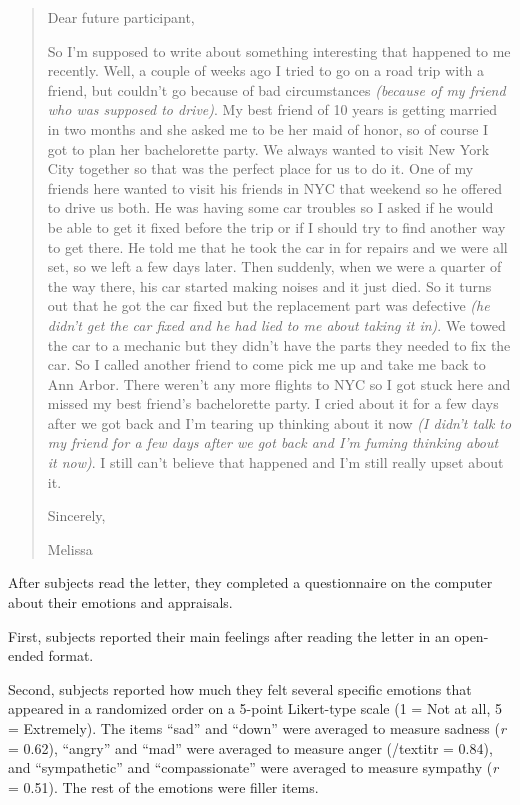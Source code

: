 \documentclass[man,a4paper,noextraspace,apacite]{apa6}\usepackage[]{graphicx}\usepackage[]{color}
\begin{document}
\begin{quote}
Dear future participant,

    So I'm supposed to write about something interesting that happened to me recently. Well, a couple of weeks ago I tried to go on a road trip with a friend, but couldn't go because of bad circumstances \textit{(because of my friend who was supposed to drive)}. My best friend of 10 years is getting married in two months and she asked me to be her maid of honor, so of course I got to plan her bachelorette party. We always wanted to visit New York City together so that was the perfect place for us to do it. One of my friends here wanted to visit his friends in NYC that weekend so he offered to drive us both. He was having some car troubles so I asked if he would be able to get it fixed before the trip or if I should try to find another way to get there. He told me that he took the car in for repairs and we were all set, so we left a few days later. Then suddenly, when we were a quarter of the way there, his car started making noises and it just died. So it turns out that he got the car fixed but the replacement part was defective \textit{(he didn't get the car fixed and he had lied to me about taking it in)}. We towed the car to a mechanic but they didn't have the parts they needed to fix the car. So I called another friend to come pick me up and take me back to Ann Arbor. There weren't any more flights to NYC so I got stuck here and missed my best friend's bachelorette party. I cried about it for a few days after we got back and I'm tearing up thinking about it now \textit{(I didn't talk to my friend for a few days after we got back and I'm fuming thinking about it now)}. I still can't believe that happened and I'm still really upset about it.

Sincerely,

Melissa

\end{quote}

After subjects read the letter, they completed a questionnaire on the computer about their emotions and appraisals.

First, subjects reported their main feelings after reading the letter in an open-ended format.


Second, subjects reported how much they felt several specific emotions that appeared in a randomized order on a 5-point Likert-type scale (1 = Not at all, 5 = Extremely). The items ``sad'' and ``down'' were averaged to measure sadness (\textit{r} = 0.62), ``angry'' and ``mad'' were averaged to measure anger (/textit{r} = 0.84), and ``sympathetic'' and ``compassionate'' were averaged to measure sympathy (\textit{r} = 0.51). The rest of the emotions were filler items.
\end{document}
